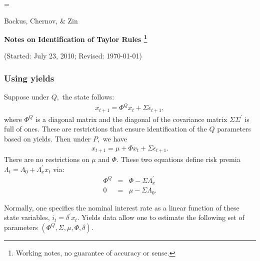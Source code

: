 \documentclass[11pt]{article}
\begin{document}
\parskip=\bigskipamount
\parindent=0.0in
\thispagestyle{empty}
\begin{flushright} Backus, Chernov, \& Zin \end{flushright}

\bigskip
\centerline{\Large \bf Notes on Identification of Taylor Rules%
\footnote{Working notes, no guarantee of accuracy or sense.}}
\centerline{(Started: July 23, 2010; Revised: \today)}


\subsubsection*{Using yields}

Suppose under $Q,$ the state follows:
\begin{eqnarray}
     x_{t+1}=\Phi^Q x_t + \Sigma \epsilon_{t+1},
\end{eqnarray}
where $\Phi^Q$ is a diagonal matrix and the diagonal of the covariance matrix $\Sigma \Sigma^{\prime}$ is full of ones. These are restrictions that ensure identification of the $Q$ parameters based on yields. Then under $P,$ we have
\begin{eqnarray}
     x_{t+1}=\mu+\Phi x_t + \Sigma \epsilon_{t+1}.
\end{eqnarray}
There are no restrictions on $\mu$ and $\Phi.$ These two equations define risk premia $\Lambda_t=\Lambda_0+\Lambda_x^{\prime} x_t$ via:
\begin{eqnarray}
\label{L1}
   \Phi^Q&=& \Phi-\Sigma\Lambda_x^{\prime} \\
\label{L0}
   0 &=& \mu-\Sigma\Lambda_0.
\end{eqnarray}

Normally, one specifies the nominal interest rate as a linear function of these state variables, $i_t=\delta^{'}x_t.$ Yields data allow one to estimate the following set of parameters $(\Phi^Q, \Sigma, \mu, \Phi, \delta).$
\end{document}
